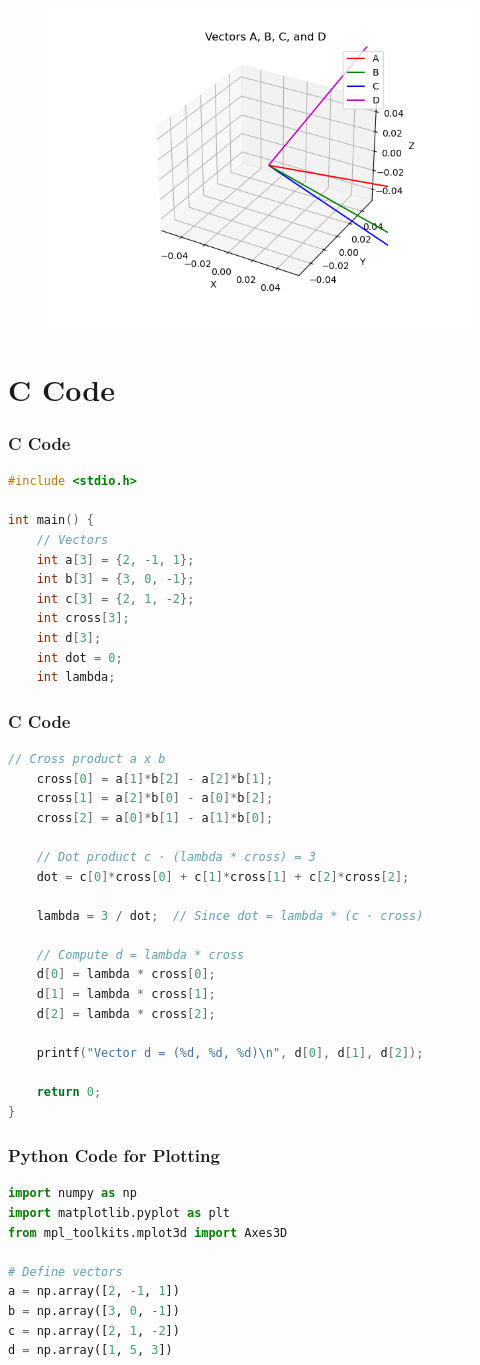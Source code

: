 \documentclass{beamer}
\theoremstyle{remark}
\numberwithin{equation}{section}
\begin{document}
       \begin{frame}[fragile]
    \begin{figure}[H]
    \centering
    \includegraphics[width = 0.6\columnwidth]{../figs/img.png}
    \caption*{}
    \label{figs}
\end{figure}
\end{frame}
\section{ C Code}
\begin{frame}[fragile]
\frametitle{C Code }
\begin{lstlisting}[language=C]
#include <stdio.h>

int main() {
    // Vectors
    int a[3] = {2, -1, 1};
    int b[3] = {3, 0, -1};
    int c[3] = {2, 1, -2};
    int cross[3];
    int d[3];
    int dot = 0;
    int lambda;
\end{lstlisting}
\end{frame}

\begin{frame}[fragile]
\frametitle{C Code }
\begin{lstlisting}[language=C]
       // Cross product a x b
    cross[0] = a[1]*b[2] - a[2]*b[1];
    cross[1] = a[2]*b[0] - a[0]*b[2];
    cross[2] = a[0]*b[1] - a[1]*b[0];

    // Dot product c · (lambda * cross) = 3
    dot = c[0]*cross[0] + c[1]*cross[1] + c[2]*cross[2];
    
    lambda = 3 / dot;  // Since dot = lambda * (c · cross)

    // Compute d = lambda * cross
    d[0] = lambda * cross[0];
    d[1] = lambda * cross[1];
    d[2] = lambda * cross[2];

    printf("Vector d = (%d, %d, %d)\n", d[0], d[1], d[2]);

    return 0;
}

\end{lstlisting}
\end{frame}
\begin{frame}[fragile]
\frametitle{Python Code for Plotting}
\begin{lstlisting}[language=Python]
import numpy as np
import matplotlib.pyplot as plt
from mpl_toolkits.mplot3d import Axes3D

# Define vectors
a = np.array([2, -1, 1])
b = np.array([3, 0, -1])
c = np.array([2, 1, -2])
d = np.array([1, 5, 3])
\end{lstlisting}

\end{frame}
\end{document}
